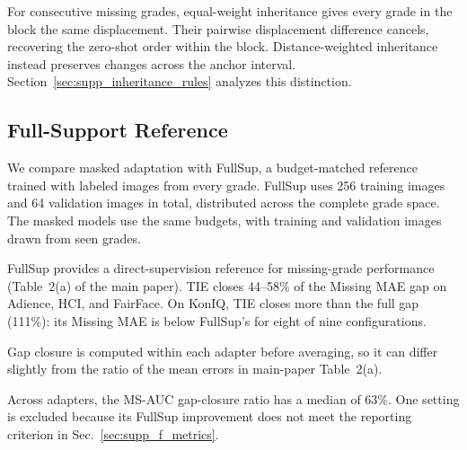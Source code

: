 For consecutive missing grades, equal-weight inheritance gives every grade in the block the same displacement. Their pairwise displacement difference cancels, recovering the zero-shot order within the block. Distance-weighted inheritance instead preserves changes across the anchor interval. Section~\ref{sec:supp_inheritance_rules} analyzes this distinction.

\subsection{Full-Support Reference}
\label{sec:supp_fullsupport}

We compare masked adaptation with FullSup, a budget-matched reference trained with labeled images from every grade. FullSup uses 256 training images and 64 validation images in total, distributed across the complete grade space. The masked models use the same budgets, with training and validation images drawn from seen grades.

FullSup provides a direct-supervision reference for missing-grade performance (Table~2(a) of the main paper). TIE closes 44--58\% of the Missing MAE gap on Adience, HCI, and FairFace. On KonIQ, TIE closes more than the full gap (111\%): its Missing MAE is below FullSup's for eight of nine configurations.

Gap closure is computed within each adapter before averaging, so it can differ slightly from the ratio of the mean errors in main-paper Table~2(a).

Across adapters, the MS-AUC gap-closure ratio has a median of 63\%. One setting is excluded because its FullSup improvement does not meet the reporting criterion in Sec.~\ref{sec:supp_f_metrics}.

